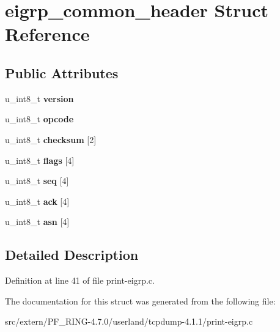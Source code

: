 \hypertarget{structeigrp__common__header}{
\section{eigrp\_\-common\_\-header Struct Reference}
\label{structeigrp__common__header}
}
\subsection*{Public Attributes}
\begin{DoxyCompactItemize}
\item 
\hypertarget{structeigrp__common__header_a2f041c26a43553a07e0938aa2428066e}{
u\_\-int8\_\-t {\bfseries version}}
\label{structeigrp__common__header_a2f041c26a43553a07e0938aa2428066e}

\item 
\hypertarget{structeigrp__common__header_a1c54c5f477f23cece14e6b5fe32d0390}{
u\_\-int8\_\-t {\bfseries opcode}}
\label{structeigrp__common__header_a1c54c5f477f23cece14e6b5fe32d0390}

\item 
\hypertarget{structeigrp__common__header_ac89c086e802ce3c7b4468a284b4e1e95}{
u\_\-int8\_\-t {\bfseries checksum} \mbox{[}2\mbox{]}}
\label{structeigrp__common__header_ac89c086e802ce3c7b4468a284b4e1e95}

\item 
\hypertarget{structeigrp__common__header_aa6465d9aca2b8205a36f9de2562175d3}{
u\_\-int8\_\-t {\bfseries flags} \mbox{[}4\mbox{]}}
\label{structeigrp__common__header_aa6465d9aca2b8205a36f9de2562175d3}

\item 
\hypertarget{structeigrp__common__header_a758fdc50892c297ed6e81d0ba02eee56}{
u\_\-int8\_\-t {\bfseries seq} \mbox{[}4\mbox{]}}
\label{structeigrp__common__header_a758fdc50892c297ed6e81d0ba02eee56}

\item 
\hypertarget{structeigrp__common__header_a62dccaea8535799575ca0ba075106487}{
u\_\-int8\_\-t {\bfseries ack} \mbox{[}4\mbox{]}}
\label{structeigrp__common__header_a62dccaea8535799575ca0ba075106487}

\item 
\hypertarget{structeigrp__common__header_ac14993786e543943490f6741fdaae30f}{
u\_\-int8\_\-t {\bfseries asn} \mbox{[}4\mbox{]}}
\label{structeigrp__common__header_ac14993786e543943490f6741fdaae30f}

\end{DoxyCompactItemize}


\subsection{Detailed Description}


Definition at line 41 of file print-\/eigrp.c.



The documentation for this struct was generated from the following file:\begin{DoxyCompactItemize}
\item 
src/extern/PF\_\-RING-\/4.7.0/userland/tcpdump-\/4.1.1/print-\/eigrp.c\end{DoxyCompactItemize}
